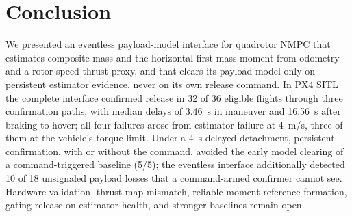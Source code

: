 \documentclass[conference]{IEEEtran}
\begin{document}
\section{Conclusion}
We presented an eventless payload-model interface for quadrotor NMPC that estimates composite
mass and the horizontal first mass moment from odometry and a rotor-speed thrust proxy, and
that clears its payload model only on persistent estimator evidence, never on its own release
command. In PX4 SITL the complete interface confirmed release in 32 of 36 eligible flights through
three confirmation paths, with median delays of \SI{3.46}{s} in maneuver and \SI{16.56}{s} after
braking to hover; all four failures arose from estimator failure at \SI{4}{m/s}, three of them
at the vehicle's torque limit. Under a \SI{4}{s} delayed detachment, persistent confirmation, with or without the
command, avoided the early model clearing of a command-triggered baseline (5/5); the eventless
interface additionally detected 10 of 18 unsignaled payload losses that a command-armed
confirmer cannot see. Hardware validation, thrust-map mismatch, reliable moment-reference formation, gating release
on estimator health, and stronger baselines remain open.



\end{document}
